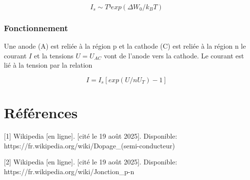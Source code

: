            \begin{equation}
                I_s \sim T³exp(\Delta W_0/k_BT)
            \end{equation}
        

        \subsubsection{Fonctionnement}
            Une anode (A) est reliée à la région p et la cathode (C) est reliée à la région n le courant $I$ et la tensions $U= U_{AC}$ vont de l'anode vers la cathode. Le courant est lié à la tension par la relation 

            \begin{equation}
                I = I_s[exp(U/nU_T)-1]
            \end{equation}

    \section{Références}
        [1] Wikipedia [en ligne]. [cité le 19 août 2025]. Disponible: https://fr.wikipedia.org/wiki/Dopage_(semi-conducteur)

        [2] Wikipedia [en ligne]. [cité le 19 août 2025]. Disponible: https://fr.wikipedia.org/wiki/Jonction_p-n

